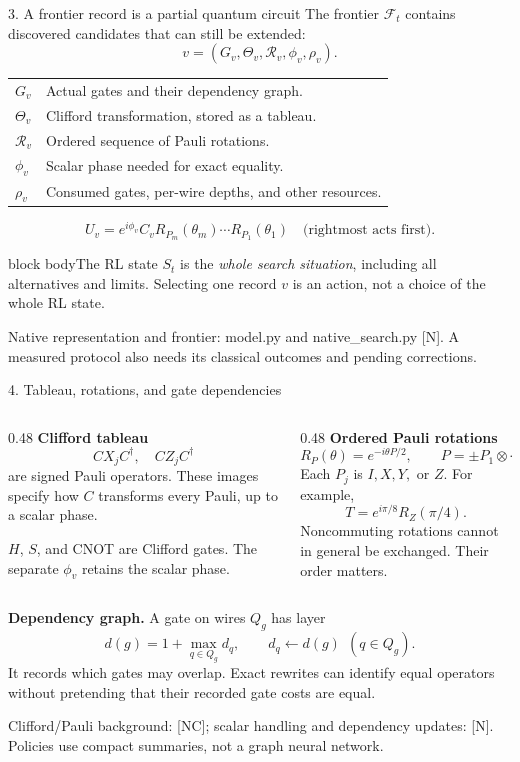 \documentclass[aspectratio=169,11pt]{beamer}
\newcommand{\src}[1]{\par\vfill{\fontsize{6.6}{7.8}\selectfont\color{muted}#1\par}}
\newcommand{\takeaway}[1]{\par\smallskip\begin{beamercolorbox}[sep=1.4mm,wd=\linewidth]{block body}\small #1\end{beamercolorbox}}
\newcommand{\labeltext}[1]{{\color{accent}\bfseries #1}}
\begin{document}
\begin{frame}[t]{3. A frontier record is a partial quantum circuit}
\small
The frontier $\mathcal F_t$ contains discovered candidates that can still be extended:
\[
 \boxed{v=(G_v,\Theta_v,\mathcal R_v,\phi_v,\rho_v).}
\]
\begin{center}
\begin{tabular}{@{}ll@{}}
$G_v$ & Actual gates and their dependency graph.\\[2pt]
$\Theta_v$ & Clifford transformation, stored as a tableau.\\[2pt]
$\mathcal R_v$ & Ordered sequence of Pauli rotations.\\[2pt]
$\phi_v$ & Scalar phase needed for exact equality.\\[2pt]
$\rho_v$ & Consumed gates, per-wire depths, and other resources.
\end{tabular}
\end{center}
\[
 U_v=e^{i\phi_v}C_vR_{P_m}(\theta_m)\cdots R_{P_1}(\theta_1)
 \quad\text{(rightmost acts first).}
\]
\takeaway{The RL state $S_t$ is the \emph{whole search situation}, including all alternatives and limits. Selecting one record $v$ is an action, not a choice of the whole RL state.}
\src{Native representation and frontier: model.py and native\_search.py [N]. A measured protocol also needs its classical outcomes and pending corrections.}
\end{frame}

\begin{frame}[t]{4. Tableau, rotations, and gate dependencies}
\small
\begin{columns}[T,onlytextwidth]
\begin{column}{0.48\textwidth}
\labeltext{Clifford tableau}
\[
 C X_j C^\dagger,\quad C Z_j C^\dagger
\]
are signed Pauli operators. These images specify how $C$ transforms every Pauli, up to a scalar phase.

\smallskip
$H$, $S$, and CNOT are Clifford gates. The separate $\phi_v$ retains the scalar phase.
\end{column}
\begin{column}{0.48\textwidth}
\labeltext{Ordered Pauli rotations}
\[
 R_P(\theta)=e^{-i\theta P/2},\qquad
 P=\pm P_1\otimes\cdots\otimes P_n.
\]
Each $P_j$ is $I,X,Y,$ or $Z$. For example,
\[
 T=e^{i\pi/8}R_Z(\pi/4).
\]
Noncommuting rotations cannot in general be exchanged. Their order matters.
\end{column}
\end{columns}
\smallskip
\labeltext{Dependency graph.} A gate on wires $Q_g$ has layer
\[
 d(g)=1+\max_{q\in Q_g}d_q,
 \qquad d_q\leftarrow d(g)\ \ (q\in Q_g).
\]
It records which gates may overlap. Exact rewrites can identify equal operators without pretending that their recorded gate costs are equal.
\src{Clifford/Pauli background: [NC]; scalar handling and dependency updates: [N]. Policies use compact summaries, not a graph neural network.}
\end{frame}
\end{document}
